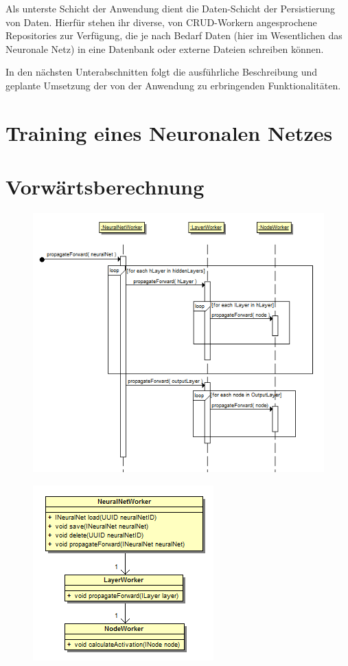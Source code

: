 Als unterste Schicht der Anwendung dient die Daten-Schicht der Persistierung von Daten. Hierfür stehen ihr diverse, von CRUD-Workern angesprochene Repositories zur Verfügung, die je nach Bedarf Daten (hier im Wesentlichen das Neuronale Netz) in eine Datenbank oder externe Dateien schreiben können.

In den nächsten Unterabschnitten folgt die ausführliche Beschreibung und geplante Umsetzung der von der Anwendung zu erbringenden Funktionalitäten.  

\section{Training eines Neuronalen Netzes}

\section{Vorwärtsberechnung}

\begin{figure}[h]
\begin{center}
\includegraphics{Abbildungen/UML/uml_ronny/propagateForward.png}
\end{center}
\end{figure}

\begin{figure}[h]
\begin{center}
\includegraphics{Abbildungen/UML/uml_ronny/workerclass.png}
\end{center}
\end{figure}
